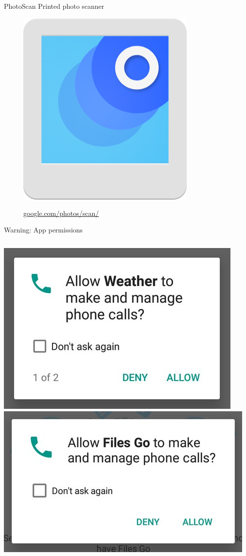 \documentclass[serif,14pt,color=usenames,dvipsnames]{beamer}
\begin{document}
\begin{frame}{PhotoScan}
  Printed photo scanner

  \begin{figure}
  \centering
  \includegraphics[width=0.3\linewidth]{imgs/photoscan2}

  \href{https://google.com/photos/scan/}{google.com/photos/scan/}
  \end{figure}
\end{frame}

\begin{frame}{Warning: App permissions}

  \begin{columns}
      \centering
      \includegraphics[width=\linewidth]{imgs/weather}
      \centering
      \includegraphics[width=\linewidth]{imgs/filesgo}
  \end{columns}
\end{frame}
\end{document}
